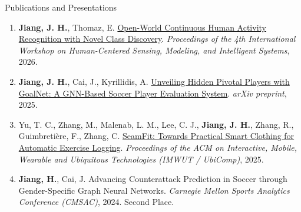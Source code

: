 \documentclass{resume}
\begin{document}
\begin{rSection}{Publications and Presentations}
\begin{enumerate}
\itemsep -6pt
\item \textbf{Jiang, J. H.}, Thomaz, E. \href{https://dl.acm.org/doi/10.1145/3842436.3843804}{Open-World Continuous Human Activity Recognition with Novel Class Discovery}. \textit{Proceedings of the 4th International Workshop on Human-Centered Sensing, Modeling, and Intelligent Systems}, 2026.
\item \textbf{Jiang, J. H.}, Cai, J., Kyrillidis, A. \href{https://arxiv.org/abs/2503.09737}{Unveiling Hidden Pivotal Players with GoalNet: A GNN-Based Soccer Player Evaluation System}. \textit{arXiv preprint}, 2025.
\item Yu, T. C., Zhang, M., Malenab, L. M., Lee, C. J., \textbf{Jiang, J. H.}, Zhang, R., Guimbreti\`ere, F., Zhang, C. \href{https://dl.acm.org/doi/10.1145/3712287}{SeamFit: Towards Practical Smart Clothing for Automatic Exercise Logging}. \textit{Proceedings of the ACM on Interactive, Mobile, Wearable and Ubiquitous Technologies (IMWUT / UbiComp)}, 2025.
\item \textbf{Jiang, H.}, Cai, J. Advancing Counterattack Prediction in Soccer through Gender-Specific Graph Neural Networks. \textit{Carnegie Mellon Sports Analytics Conference (CMSAC)}, 2024. Second Place.
\end{enumerate}
\end{rSection}
\end{document}
